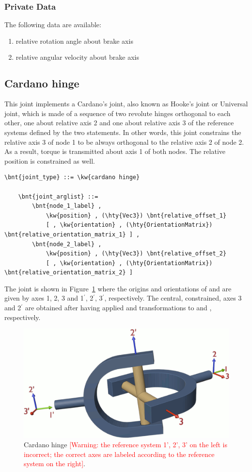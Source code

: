 \subsubsection{Private Data}
The following data are available:
\begin{enumerate}
\item {} relative rotation angle about brake axis
\item {} relative angular velocity about brake axis
\end{enumerate}




\subsection{Cardano hinge}
\label{sec:EL:STRUCT:JOINT:CARDANO_HINGE}
This joint implements a Cardano's joint, also known as Hooke's joint
or Universal joint, which is made of a sequence
of two revolute hinges orthogonal to each other, one about relative axis 2
and one about relative axis 3 of the reference systems
defined by the two  %
statements.
In other words, this joint constrains the relative axis 3 of node 1 
to be always orthogonal to the relative axis 2 of node 2.
As a result, torque is transmitted about axis 1 of both nodes.
The relative position is constrained as well.
\begin{Verbatim}[commandchars=\\\{\}]
    \bnt{joint_type} ::= \kw{cardano hinge}

    \bnt{joint_arglist} ::= 
        \bnt{node_1_label} ,
            \kw{position} , (\hty{Vec3}) \bnt{relative_offset_1}
            [ , \kw{orientation} , (\hty{OrientationMatrix}) \bnt{relative_orientation_matrix_1} ] ,
        \bnt{node_2_label} ,
            \kw{position} , (\hty{Vec3}) \bnt{relative_offset_2}
            [ , \kw{orientation} , (\hty{OrientationMatrix}) \bnt{relative_orientation_matrix_2} ]
\end{Verbatim}
The joint is shown in Figure~\ref{fig:el:joint:CARDANO} where the origins and orientations of  and  are given by axes 1, 2, 3 and 1$^\prime$, 2$^\prime$, 3$^\prime$, respectively. The central, constrained, axes 3 and 2$^\prime$ are obtained after having applied  and  transformations to  and , respectively.
\begin{figure}
\centering
\includegraphics[width=.5\textwidth]{cardano}
\caption{Cardano hinge \textcolor{red}{[Warning: the reference system 1', 2', 3' on the left is incorrect; the correct axes are labeled according to the reference system on the right]}.}
\label{fig:el:joint:CARDANO}
\end{figure}
